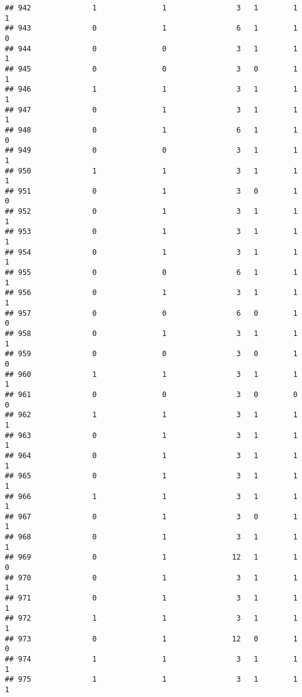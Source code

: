 \documentclass[]{article}
\begin{document}
\begin{verbatim}
## 942              1               1                3   1        1        1
## 943              0               1                6   1        1        0
## 944              0               0                3   1        1        1
## 945              0               0                3   0        1        1
## 946              1               1                3   1        1        1
## 947              0               1                3   1        1        1
## 948              0               1                6   1        1        0
## 949              0               0                3   1        1        1
## 950              1               1                3   1        1        1
## 951              0               1                3   0        1        0
## 952              0               1                3   1        1        1
## 953              0               1                3   1        1        1
## 954              0               1                3   1        1        1
## 955              0               0                6   1        1        1
## 956              0               1                3   1        1        1
## 957              0               0                6   0        1        0
## 958              0               1                3   1        1        1
## 959              0               0                3   0        1        0
## 960              1               1                3   1        1        1
## 961              0               0                3   0        0        0
## 962              1               1                3   1        1        1
## 963              0               1                3   1        1        1
## 964              0               1                3   1        1        1
## 965              0               1                3   1        1        1
## 966              1               1                3   1        1        1
## 967              0               1                3   0        1        1
## 968              0               1                3   1        1        1
## 969              0               1               12   1        1        0
## 970              0               1                3   1        1        1
## 971              0               1                3   1        1        1
## 972              1               1                3   1        1        1
## 973              0               1               12   0        1        0
## 974              1               1                3   1        1        1
## 975              1               1                3   1        1        1

\end{verbatim}
\end{document}
